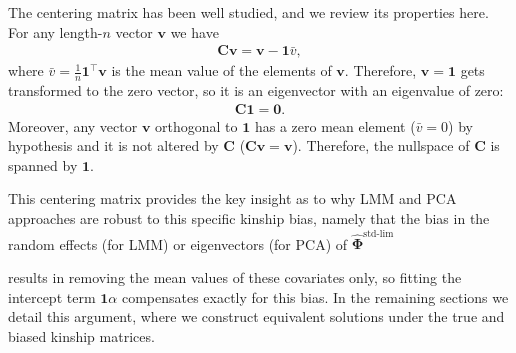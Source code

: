 \documentclass[11pt]{article}
\newcommand{\kinMat}{%
  \ensuremath{%
    \mathbf{\Phi}
  }%
  \xspace%
}%
\newcommand{\kinMatEstNamed}[1]{%
  \ensuremath{%
    \mathbf{\hat{\Phi}}^\text{#1}
  }%
  \xspace%
}%
\newcommand{\kinMatStdLim}{%
  \kinMatEstNamed{std-lim}
}%
\begin{document}
The centering matrix has been well studied, and we review its properties here.
For any length-$n$ vector $\mathbf{v}$ we have
\begin{align*}
  \mathbf{C} \mathbf{v}
  =
  \mathbf{v} - \mathbf{1} \bar{v}
  ,
\end{align*}
where $\bar{v} = \frac{1}{n} \mathbf{1}^\intercal \mathbf{v}$ is the mean value of the elements of $\mathbf{v}$.
Therefore, $\mathbf{v} = \mathbf{1}$ gets transformed to the zero vector, so it is an eigenvector with an eigenvalue of zero:
\begin{align*}
  \mathbf{C} \mathbf{1}
  =
  \mathbf{0}
  .
\end{align*}
Moreover, any vector $\mathbf{v}$ orthogonal to $\mathbf{1}$ has a zero mean element ($\bar{v} = 0$) by hypothesis and it is not altered by $\mathbf{C}$ ($\mathbf{C} \mathbf{v} = \mathbf{v}$).
Therefore, the nullspace of $\mathbf{C}$ is spanned by $\mathbf{1}$.

This centering matrix provides the key insight as to why LMM and PCA approaches are robust to this specific kinship bias, namely that the bias in the random effects (for LMM) or eigenvectors (for PCA) of \kinMatStdLim results in removing the mean values of these covariates only, so fitting the intercept term $\mathbf{1} \alpha$ compensates exactly for this bias.
In the remaining sections we detail this argument, where we construct equivalent solutions under the true and biased kinship matrices.



\end{document}
